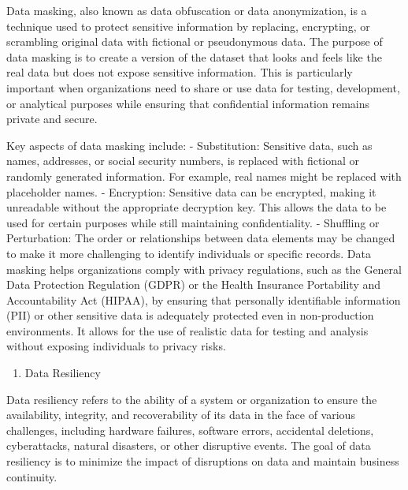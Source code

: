 \documentclass[
  letterpaper,
  DIV=11,
  numbers=noendperiod]{scrreprt}
\providecommand{\tightlist}{%
  \setlength{\itemsep}{0pt}\setlength{\parskip}{0pt}}\usepackage{longtable,booktabs,array}
\begin{document}
Data masking, also known as data obfuscation or data anonymization, is a
technique used to protect sensitive information by replacing,
encrypting, or scrambling original data with fictional or pseudonymous
data. The purpose of data masking is to create a version of the dataset
that looks and feels like the real data but does not expose sensitive
information. This is particularly important when organizations need to
share or use data for testing, development, or analytical purposes while
ensuring that confidential information remains private and secure.

Key aspects of data masking include: - Substitution: Sensitive data,
such as names, addresses, or social security numbers, is replaced with
fictional or randomly generated information. For example, real names
might be replaced with placeholder names. - Encryption: Sensitive data
can be encrypted, making it unreadable without the appropriate
decryption key. This allows the data to be used for certain purposes
while still maintaining confidentiality. - Shuffling or Perturbation:
The order or relationships between data elements may be changed to make
it more challenging to identify individuals or specific records. Data
masking helps organizations comply with privacy regulations, such as the
General Data Protection Regulation (GDPR) or the Health Insurance
Portability and Accountability Act (HIPAA), by ensuring that personally
identifiable information (PII) or other sensitive data is adequately
protected even in non-production environments. It allows for the use of
realistic data for testing and analysis without exposing individuals to
privacy risks.

\begin{enumerate}
\def\labelenumi{\arabic{enumi}.}
\setcounter{enumi}{3}
\tightlist
\item
  Data Resiliency
\end{enumerate}

Data resiliency refers to the ability of a system or organization to
ensure the availability, integrity, and recoverability of its data in
the face of various challenges, including hardware failures, software
errors, accidental deletions, cyberattacks, natural disasters, or other
disruptive events. The goal of data resiliency is to minimize the impact
of disruptions on data and maintain business continuity.
\end{document}
